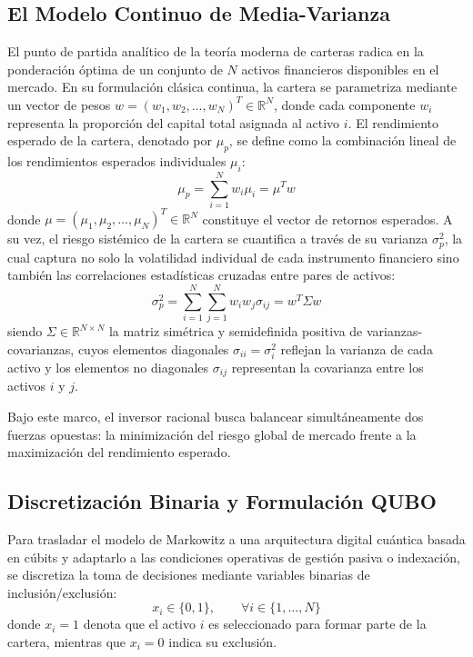 \subsection{El Modelo Continuo de Media-Varianza}
\label{subsec:markowitz_continuo}

El punto de partida analítico de la teoría moderna de carteras \cite{Markowitz1952} radica en la ponderación óptima de un conjunto de $N$ activos financieros disponibles en el mercado. En su formulación clásica continua, la cartera se parametriza mediante un vector de pesos $w = (w_1, w_2, \dots, w_N)^T \in \mathbb{R}^N$, donde cada componente $w_i$ representa la proporción del capital total asignada al activo $i$. El rendimiento esperado de la cartera, denotado por $\mu_p$, se define como la combinación lineal de los rendimientos esperados individuales $\mu_i$:
\begin{equation}
    \mu_p = \sum_{i=1}^{N} w_i \mu_i = \mu^T w
    \label{eq:retorno_cartera}
\end{equation}
donde $\mu = (\mu_1, \mu_2, \dots, \mu_N)^T \in \mathbb{R}^N$ constituye el vector de retornos esperados. A su vez, el riesgo sistémico de la cartera se cuantifica a través de su varianza $\sigma_p^2$, la cual captura no solo la volatilidad individual de cada instrumento financiero sino también las correlaciones estadísticas cruzadas entre pares de activos:
\begin{equation}
    \sigma_p^2 = \sum_{i=1}^{N} \sum_{j=1}^{N} w_i w_j \sigma_{ij} = w^T \Sigma w
    \label{eq:riesgo_cartera}
\end{equation}
siendo $\Sigma \in \mathbb{R}^{N \times N}$ la matriz simétrica y semidefinida positiva de varianzas-covarianzas, cuyos elementos diagonales $\sigma_{ii} = \sigma_i^2$ reflejan la varianza de cada activo y los elementos no diagonales $\sigma_{ij}$ representan la covarianza entre los activos $i$ y $j$.

Bajo este marco, el inversor racional busca balancear simultáneamente dos fuerzas opuestas: la minimización del riesgo global de mercado frente a la maximización del rendimiento esperado.

\subsection{Discretización Binaria y Formulación QUBO}
\label{subsec:discretizacion_qubo}

Para trasladar el modelo de Markowitz a una arquitectura digital cuántica basada en cúbits y adaptarlo a las condiciones operativas de gestión pasiva o indexación, se discretiza la toma de decisiones mediante variables binarias de inclusión/exclusión:
\begin{equation}
    x_i \in \{0, 1\}, \qquad \forall i \in \{1, \dots, N\}
    \label{eq:variable_binaria}
\end{equation}
donde $x_i = 1$ denota que el activo $i$ es seleccionado para formar parte de la cartera, mientras que $x_i = 0$ indica su exclusión.


